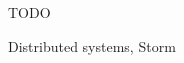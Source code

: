 \begin{abstracten}
TODO
\begin{keywordsen}
Distributed systems, Storm
\end{keywordsen}
\end{abstracten}